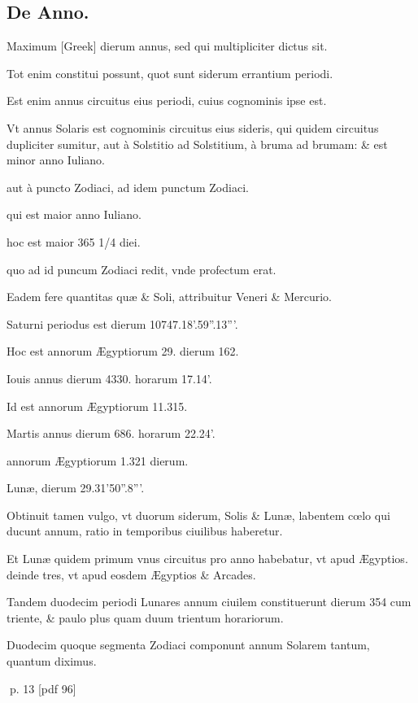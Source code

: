 \subsection{De Anno.}
\setcounter{parcount}{0}
\begin{parnumbers}

Maximum \textgreek{[Greek]} dierum annus, sed qui multipliciter dictus sit.

Tot enim constitui possunt, quot sunt siderum errantium periodi.

Est enim annus circuitus eius periodi, cuius cognominis ipse est.

Vt annus Solaris est cognominis circuitus eius  sideris, qui quidem circuitus dupliciter sumitur, aut à Solstitio ad Solstitium, à bruma ad brumam: \& est minor anno Iuliano.

aut à puncto Zodiaci, ad idem punctum Zodiaci.

qui est maior anno Iuliano.

hoc est maior 365 1/4 diei.

quo ad id puncum Zodiaci redit, vnde profectum erat.

Eadem fere quantitas quæ \& Soli, attribuitur Veneri \& Mercurio.

Saturni periodus est dierum 10747.18'.59''.13'''.

Hoc est annorum Ægyptiorum 29. dierum 162.

Iouis annus dierum 4330. horarum 17.14'.

Id est annorum Ægyptiorum 11.315.

Martis annus dierum 686. horarum 22.24'.

annorum Ægyptiorum 1.321 dierum.

Lunæ, dierum 29.31'50''.8'''.

Obtinuit tamen vulgo, vt duorum siderum, Solis \& Lunæ, labentem cœlo qui ducunt annum, ratio in  temporibus ciuilibus haberetur.

Et Lunæ quidem primum vnus circuitus pro anno habebatur, vt apud Ægyptios. deinde tres, vt apud eosdem Ægyptios \& Arcades.

Tandem duodecim periodi Lunares annum ciuilem constituerunt dierum 354 cum triente, \& paulo plus quam duum trientum horariorum.

Duodecim quoque segmenta Zodiaci componunt annum Solarem tantum, quantum diximus.

\end{parnumbers}
\clearpage
p. 13 [pdf 96]

